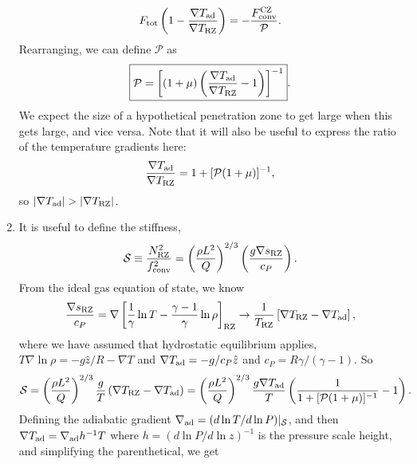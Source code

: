 \documentclass[onecolumn, amsmath, amsfonts, amssymb]{aastex62}
\newcommand{\grad}{\ensuremath{\nabla}}
\newcommand{\mP}{\ensuremath{\mathcal{P}}}
\newcommand{\mS}{\ensuremath{\mathcal{S}}}
\newcommand{\FconvCZ}{\ensuremath{F_{\rm{conv}}^{\rm{CZ}}}}
\begin{document}
\begin{enumerate}
        \begin{equation}
            F_{\rm{tot}}\left(1 - \frac{\grad T_{\rm{ad}}}{\grad T_{\rm{RZ}}}\right)
            = - \frac{\FconvCZ}{\mathcal{P}}.
        \end{equation}
        Rearranging, we can define $\mP$ as
        \begin{equation}
            \boxed{
                \mathcal{P} = \left[(1 + \mu) \left(\frac{\grad T_{\rm{ad}}}{\grad T_{\rm{RZ}}} - 1\right)\right]^{-1}}.
        \end{equation}
        We expect the size of a hypothetical penetration zone to get large when this gets large, and vice versa.
        Note that it will also be useful to express the ratio of the temperature gradients here:
        \begin{equation}
            \frac{\grad T_{\rm{ad}}}{\grad T_{\rm{RZ}}} = 1 + [\mathcal{P}(1 + \mu)]^{-1},
        \end{equation}
        so $|\grad T_{\rm{ad}}| > |\grad T_{\rm{RZ}}|$.
    \item It is useful to define the stiffness,
        \begin{equation}
            \mathcal{S} \equiv \frac{N_{\rm{RZ}}^2}{f_{\rm{conv}}^2}
            = \left(\frac{\rho L^2}{Q}\right)^{2/3}\left(\frac{g \grad s_{\rm{RZ}}}{c_P}\right).
        \end{equation}
        From the ideal gas equation of state, we know
        \begin{equation}
            \frac{\grad s_{\rm{RZ}}}{c_P} = \grad\left[\frac{1}{\gamma}\ln T - \frac{\gamma-1}{\gamma}\ln\rho\right]_{\rm{RZ}}
            \rightarrow
            \frac{1}{T_{\rm{RZ}}}\left[\grad T_{\rm{RZ}} - \grad T_{\rm{ad}}\right],
        \end{equation}
        where we have assumed that hydrostatic equilibrium applies, $T\grad \ln \rho = -g\hat{z} / R - \grad T$ and $\grad T_{\rm{ad}} = -g/c_P\hat{z}$ and $c_P = R \gamma/(\gamma-1)$.
        So
        \begin{equation}
            \mS = \left(\frac{\rho L^2}{Q}\right)^{2/3}\frac{g }{T}\left(\grad T_{\rm{RZ}} - \grad T_{\rm{ad}}\right)
                = \left(\frac{\rho L^2}{Q}\right)^{2/3}\frac{g \grad T_{\rm{ad}}}{T}\left(\frac{1}{1 + [\mathcal{P}(1 + \mu)]^{-1}} - 1\right).
        \end{equation}
        Defining the adiabatic gradient $\grad_{\rm{ad}} = (d\ln T / d\ln P)|_{\mathcal{S}}$, and then $\grad T_{\rm{ad}} = \grad_{\rm{ad}} h^{-1} T$ where $h = (d\ln P/d\ln z)^{-1}$ is the pressure scale height, and simplifying the parenthetical, we get

\end{enumerate}
\end{document}
